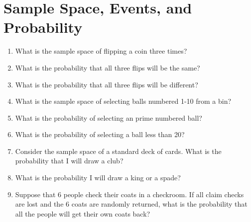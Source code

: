 \documentclass[14pt]{extarticle}
\begin{document}
\section{Sample Space, Events, and Probability}
\begin{enumerate}
	\item What is the sample space of flipping a coin three times?
	\vspace{2cm}
	\item What is the probability that all three flips will be the same?
	\vspace{2cm}
	\item What is the probability that all three flips will be different?
	\vspace{2cm}
	\item What is the sample space of selecting balls numbered 1-10 from a bin?
	\vspace{2cm}
	\item What is the probability of selecting an prime numbered ball?
	\vspace{2cm}
	\item What is the probability of selecting a ball less than 20?
	\vspace{2cm}
	\item Consider the sample space of a standard deck of cards. What is the probability that I will draw a club?
	\vspace{2cm}
	\item What is the probability I will draw a king or a spade?
	\vspace{2cm}
	\item  Suppose that 6 people check their coats in a checkroom. If all claim checks are lost and the 6 coats are randomly returned, what is the probability that all the people will get their own coats back?
\end{enumerate}
\end{document}
